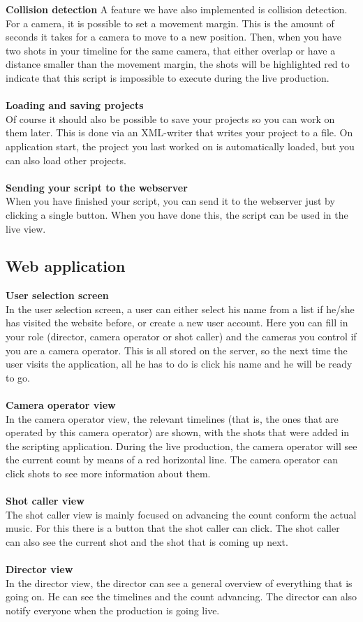 \textbf{Collision detection}
A feature we have also implemented is collision detection. For a camera, it is possible to set a movement margin. This is the amount of seconds it takes for a camera to move to a new position. Then, when you have two shots in your timeline for the same camera, that either overlap or have a distance smaller than the movement margin, the shots will be highlighted red to indicate that this script is impossible to execute during the live production.\\\\
\textbf{Loading and saving projects}\\
Of course it should also be possible to save your projects so you can work on them later. This is done via an XML-writer that writes your project to a file. On application start, the project you last worked on is automatically loaded, but you can also load other projects.\\\\
\textbf{Sending your script to the webserver}\\
When you have finished your script, you can send it to the webserver just by clicking a single button. When you have done this, the script can be used in the live view.


\subsection{Web application}
\textbf{User selection screen}\\
In the user selection screen, a user can either select his name from a list if he/she has visited the website before, or create a new user account. Here you can fill in your role (director, camera operator or shot caller) and the cameras you control if you are a camera operator. This is all stored on the server, so the next time the user visits the application, all he has to do is click his name and he will be ready to go.\\\\
\textbf{Camera operator view}\\
In the camera operator view, the relevant timelines (that is, the ones that are operated by this camera operator) are shown, with the shots that were added in the scripting application. During the live production, the camera operator will see the current count by means of a red horizontal line. The camera operator can click shots to see more information about them.\\\\
\textbf{Shot caller view}\\
The shot caller view is mainly focused on advancing the count conform the actual music. For this there is a button that the shot caller can click. The shot caller can also see the current shot and the shot that is coming up next.\\\\
\textbf{Director view}\\
In the director view, the director can see a general overview of everything that is going on. He can see the timelines and the count advancing. The director can also notify everyone when the production is going live.\\\\

